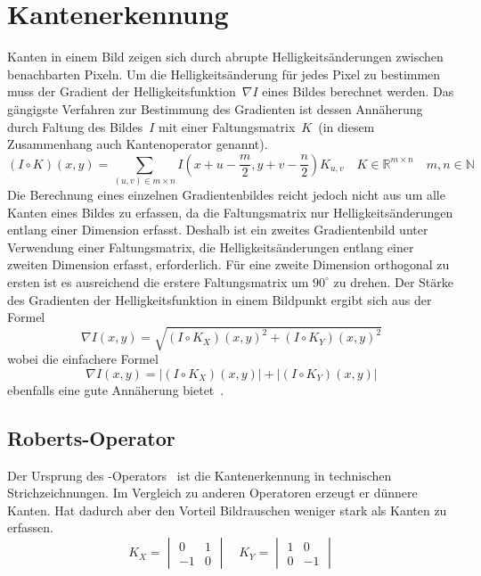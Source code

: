 \section{Kantenerkennung}
\label{sec:edge-detection}
\writtenby{\dcauthornameewie}%
Kanten in einem Bild zeigen sich durch abrupte Helligkeitsänderungen zwischen benachbarten Pixeln.
Um die Helligkeitsänderung für jedes Pixel zu bestimmen muss der Gradient der Helligkeitsfunktion~$\nabla I$ eines Bildes berechnet werden.
Das gängigste Verfahren zur Bestimmung des Gradienten ist dessen Annäherung durch Faltung des Bildes~$I$ mit einer Faltungsmatrix~$K$~(in diesem Zusammenhang auch Kantenoperator genannt).
\begin{equation}
  (I\circ K)(x,y) =
       \sum_{(u,v)\in m\times n}
       I\left(x+u-\frac{m}{2},y+v-\frac{n}{2}\right)K_{u,v}
       \quad K\in\mathbb{R}^{m\times n}
       \quad m,n \in\mathbb{N}
\end{equation}
Die Berechnung eines einzelnen Gradientenbildes reicht jedoch nicht aus um alle Kanten eines Bildes zu erfassen, da die Faltungsmatrix nur Helligkeitsänderungen entlang einer Dimension erfasst.
Deshalb ist ein zweites Gradientenbild unter Verwendung einer Faltungsmatrix, die Helligkeitsänderungen entlang einer zweiten Dimension erfasst, erforderlich.
Für eine zweite Dimension orthogonal zu ersten ist es ausreichend die erstere Faltungsmatrix um $90^\circ$ zu drehen.
Der Stärke des Gradienten der Helligkeitsfunktion in einem Bildpunkt ergibt sich aus der Formel
\begin{equation}
  \nabla I(x,y) = \sqrt{(I \circ K_X)(x,y)^2 + (I \circ K_Y)(x,y)^2}
\end{equation}
wobei die einfachere Formel
\begin{equation}
  \nabla I(x,y) = |(I \circ K_X)(x,y)| + |(I \circ K_Y)(x,y)|
\end{equation}
ebenfalls eine gute Annäherung bietet~\cite[Kapitel~5.2]{davies2012}.

\subsection*{Roberts-Operator}
Der Ursprung des -Operators~\cite[S.~26]{roberts1963} ist die Kantenerkennung in technischen Strichzeichnungen.
Im Vergleich zu anderen Operatoren erzeugt er dünnere Kanten.
Hat dadurch aber den Vorteil Bildrauschen weniger stark als Kanten zu erfassen.
\begin{equation}
  K_X = \begin{vmatrix}
     0 & 1 \\
    -1 & 0
  \end{vmatrix}
  \quad
  K_Y = \begin{vmatrix}
    1 &  0 \\
    0 & -1
  \end{vmatrix}
\end{equation}

